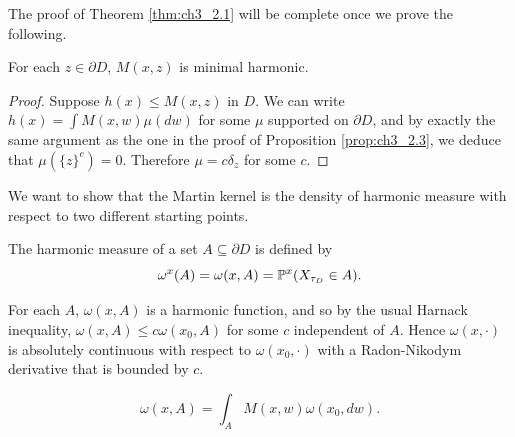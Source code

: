 The proof of Theorem \ref{thm:ch3_2.1} will be complete once we prove the following.

\begin{proposition}\label{prop:ch3_2.4}
For each $z \in \partial D$, $M(x,z)$ is minimal harmonic.
\end{proposition}

\begin{proof}
Suppose $h(x) \leq M(x,z)$ in $D$. We can write $h(x) = \int M(x,w)\mu(dw)$ for some $\mu$ supported on $\partial D$, and by exactly the same argument as the one in the proof of Proposition \ref{prop:ch3_2.3}, we deduce that $\mu(\{z\}^c) = 0$. Therefore $\mu = c\delta_z$ for some $c$.
\end{proof}


We want to show that the Martin kernel is the density of harmonic measure with respect to two different starting points.

\begin{definition}\label{def:ch3_2.5}
The harmonic measure of a set $A \subseteq \partial D$ is defined by
\begin{equation}\label{eq:ch3_2.2}
\omega^x(A) = \omega(x,A) = \P^x(X_{\tau_D} \in A).
\end{equation}
\end{definition}

For each $A$, $\omega(x,A)$ is a harmonic function, and so by the usual Harnack inequality, $\omega(x,A) \leq c\omega(x_0,A)$ for some $c$ independent of $A$. Hence $\omega(x,\cdot)$ is absolutely continuous with respect to $\omega(x_0,\cdot)$ with a Radon-Nikodym derivative that is bounded by $c$.

\begin{theorem}\label{thm:ch3_2.6}
\[
    \omega(x,A) = \int_A M(x,w)\omega(x_0,dw).
\]
\end{theorem}

